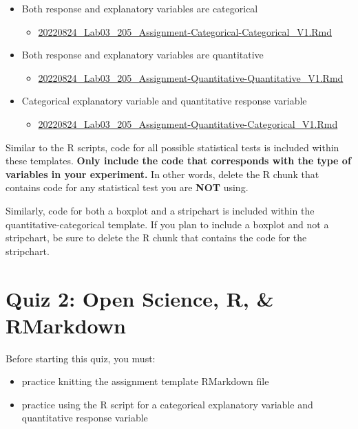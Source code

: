 \documentclass[
]{book}
\providecommand{\tightlist}{%
  \setlength{\itemsep}{0pt}\setlength{\parskip}{0pt}}
\begin{document}
\begin{itemize}
\tightlist
\item
  Both response and explanatory variables are categorical

  \begin{itemize}
  \tightlist
  \item
    \href{https://osf.io/download/98vmu}{20220824\_Lab03\_205\_Assignment-Categorical-Categorical\_V1.Rmd}
  \end{itemize}
\item
  Both response and explanatory variables are quantitative

  \begin{itemize}
  \tightlist
  \item
    \href{https://osf.io/download/75q4x}{20220824\_Lab03\_205\_Assignment-Quantitative-Quantitative\_V1.Rmd}
  \end{itemize}
\item
  Categorical explanatory variable and quantitative response variable

  \begin{itemize}
  \tightlist
  \item
    \href{https://osf.io/download/2hsk5}{20220824\_Lab03\_205\_Assignment-Quantitative-Categorical\_V1.Rmd}
  \end{itemize}
\end{itemize}

Similar to the R scripts, code for all possible statistical tests is included within these templates. \textbf{Only include the code that corresponds with the type of variables in your experiment.} In other words, delete the R chunk that contains code for any statistical test you are \textbf{NOT} using.

Similarly, code for both a boxplot and a stripchart is included within the quantitative-categorical template. If you plan to include a boxplot and not a stripchart, be sure to delete the R chunk that contains the code for the stripchart.

\hypertarget{quiz-2-open-science-r-rmarkdown}{%
\chapter*{Quiz 2: Open Science, R, \& RMarkdown}\label{quiz-2-open-science-r-rmarkdown}}

Before starting this quiz, you must:

\begin{itemize}
\tightlist
\item
  practice knitting the assignment template RMarkdown file
\item
  practice using the R script for a categorical explanatory variable and quantitative response variable
\end{itemize}
\end{document}
